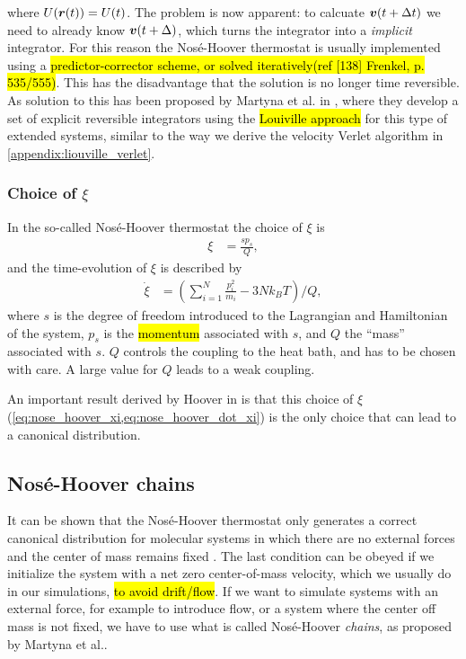 where $U(\boldsymbol{r}(t)) = U(t)$. The problem is now apparent: to calcuate $\boldsymbol{v}(t+\Delta t)$ we need to already know $\boldsymbol{v}(t+\Delta)$, which turns the integrator into a \emph{implicit} integrator. For this reason the Nosé-Hoover thermostat is usually implemented using a \hl{predictor-corrector scheme, or solved iteratively(ref [138] Frenkel, p. 535/555)}. This has the disadvantage that the solution is no longer time reversible. As solution to this has been proposed by Martyna et al. in \cite{martyna1996explicit}, where they develop a set of explicit reversible integrators using the \hl{Louiville approach} for this type of extended systems, similar to the way we derive the velocity Verlet algorithm in \cref{appendix:liouville_verlet}.

\subsubsection{Choice of $\xi$}
In the so-called Nosé-Hoover thermostat the choice of $\xi$ is
\begin{align}
    \xi             &= \frac{sp_s}{Q},\label{eq:nose_hoover_xi}
\end{align}
and the time-evolution of $\xi$ is described by
\begin{align}
    \dot\xi         &= \left( \sum_{i=1}^N \frac{p_i^2}{m_i} - 3Nk_BT \right) / Q,\label{eq:nose_hoover_dot_xi}
\end{align}
where $s$ is the degree of freedom introduced to the Lagrangian and Hamiltonian of the system, $p_s$ is the \hl{momentum} associated with $s$, and $Q$ the ``mass'' associated with $s$. $Q$ controls the coupling to the heat bath, and has to be chosen with care. A large value for $Q$ leads to a weak coupling.

An important result derived by Hoover in \cite{hoover1986constant} is that this choice of $\xi$ (\cref{eq:nose_hoover_xi,eq:nose_hoover_dot_xi}) is the only choice that can lead to a canonical distribution.



\subsection{Nosé-Hoover chains}
It can be shown that the Nosé-Hoover thermostat only generates a correct canonical distribution for molecular systems in which there are no external forces and the center of mass remains fixed \cite[Appendix B]{frenkel2001understanding}\cite{hoover1985canonical}. The last condition can be obeyed if we initialize the system with a net zero center-of-mass velocity, which we usually do in our simulations, \hl{to avoid drift/flow}. If we want to simulate systems with an external force, for example to introduce flow, or a system where the center off mass is not fixed, we have to use what is called Nosé-Hoover \emph{chains}, as proposed by Martyna et al.\cite{martyna1992nose}. 

